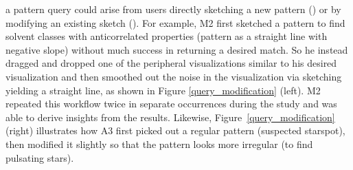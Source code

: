  a pattern query could arise
 from users directly sketching
 a new pattern ()
 or by modifying an existing sketch (). For example, M2 first sketched a pattern
 to find solvent classes with anticorrelated
 properties (pattern as a straight line with negative slope) without much success in returning a desired match.
 So he instead dragged and dropped one
 of the peripheral visualizations similar
 to his desired visualization and then smoothed
 out the noise in the visualization via sketching yielding
 a straight line,
 as shown in Figure \ref{query_modification} (left).
 M2 repeated this workflow twice in separate
 occurrences during the study and
 was able to derive insights from the results.
 Likewise, Figure~\ref{query_modification} (right)
 illustrates how A3 first picked out a regular pattern
 (suspected starspot), then modified it slightly
 so that the pattern looks more irregular (to find pulsating stars).
